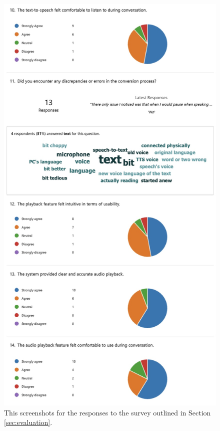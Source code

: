 \documentclass{l4proj}
\begin{document}
\begin{appendices}
\begin{figure}[H]
    \centering
    \includegraphics[width=0.75\linewidth]{dissertation/images/eval-3.jpeg}    
    \caption{This screenshots for the responses to the survey outlined in Section \ref{sec:evaluation}.}
    \label{fig:eval-survey-3} 
\end{figure}


\end{appendices}
\end{document}

